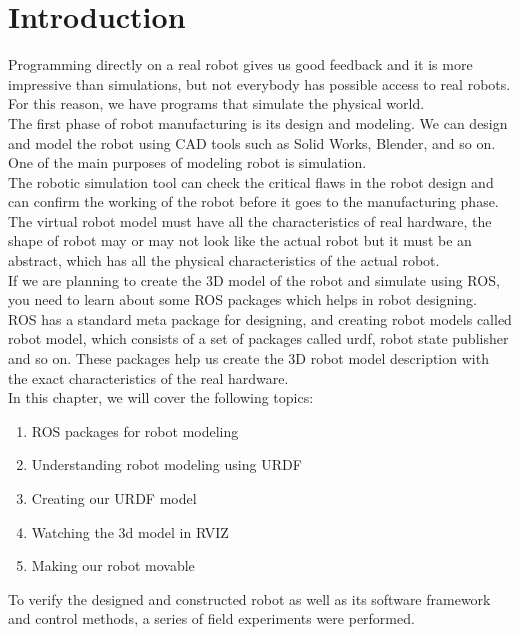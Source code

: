 
		\section{Introduction}
	Programming directly on a real robot gives us good feedback and it is more impressive
	than simulations, but not everybody has possible access to real robots. For this reason,
	we have programs that simulate the physical world.\\
	The first phase of robot manufacturing is its design and modeling. We can design and model the 
	robot using CAD tools such as Solid Works, Blender, and so on. One of the main purposes 
	of modeling robot is simulation.
	\\The robotic simulation tool can check the critical flaws in the robot design and can confirm the 
	working of the robot before it goes to the manufacturing phase.
	\\The virtual robot model must have all the characteristics of real hardware, the shape of robot 
	may or may not look like the actual robot but it must be an abstract, which has all the physical 
	characteristics of the actual robot.
	\\If we are planning to create the 3D model of the robot and simulate using ROS, you need to learn 
	about some ROS packages which helps in robot designing.
	\\ ROS has a standard meta package for designing, and creating robot models called robot model, 
	which consists of a set of packages called urdf, robot state publisher and so on. 
	These packages help us create the 3D robot model description with the exact characteristics of the 
	real hardware.
	\\ In this chapter, we will cover the following topics:
	\begin{enumerate}
		\item ROS packages for robot modeling
		
		\item    Understanding robot modeling using URDF
		
		\item    Creating our URDF model
		
		\item   Watching the 3d model in RVIZ
		\item   Making our robot movable
		
	\end{enumerate}
	To verify the designed and constructed robot as well as its software framework and control methods, a series of field experiments were performed.
